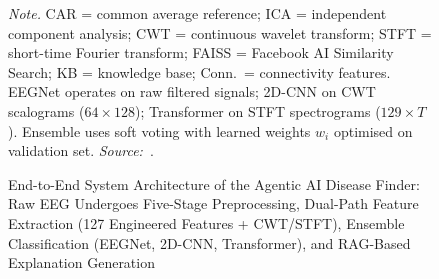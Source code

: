 \begin{figure}[!htbp]
{\begin{tikzpicture}
\end{tikzpicture}%
}
\caption[Agentic AI Disease Finder System Architecture]{End-to-End System Architecture of the Agentic AI Disease Finder: Raw EEG Undergoes Five-Stage Preprocessing, Dual-Path Feature Extraction (127 Engineered Features + CWT/STFT), Ensemble Classification (EEGNet, 2D-CNN, Transformer), and RAG-Based Explanation Generation}
\label{app_fig:eeg_disease_finder_arch}
\vspace{0.5em}\noindent\textit{Note.} CAR = common average reference; ICA = independent component analysis; CWT = continuous wavelet transform; STFT = short-time Fourier transform; FAISS = Facebook AI Similarity Search; KB = knowledge base; Conn.\ = connectivity features. EEGNet operates on raw filtered signals; 2D-CNN on CWT scalograms ($64 \times 128$); Transformer on STFT spectrograms ($129 \times T$). Ensemble uses soft voting with learned weights $w_i$ optimised on validation set. \textit{Source:}~\cite{asthana2025eegmaster}.
\end{figure}


